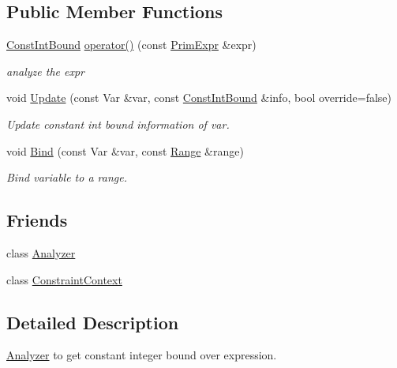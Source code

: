 \subsection*{Public Member Functions}
\begin{DoxyCompactItemize}
\item 
\hyperlink{classtvm_1_1arith_1_1ConstIntBound}{Const\+Int\+Bound} \hyperlink{classtvm_1_1arith_1_1ConstIntBoundAnalyzer_abb334cb2c9f408a907405f776b773043}{operator()} (const \hyperlink{classtvm_1_1PrimExpr}{Prim\+Expr} \&expr)
\begin{DoxyCompactList}\small\item\em analyze the expr \end{DoxyCompactList}\item 
void \hyperlink{classtvm_1_1arith_1_1ConstIntBoundAnalyzer_acde4cce7c61cd17625b5482d9c3dd422}{Update} (const Var \&var, const \hyperlink{classtvm_1_1arith_1_1ConstIntBound}{Const\+Int\+Bound} \&info, bool override=false)
\begin{DoxyCompactList}\small\item\em Update constant int bound information of var. \end{DoxyCompactList}\item 
void \hyperlink{classtvm_1_1arith_1_1ConstIntBoundAnalyzer_a5737b0f37bde66c12446f4f762e53aa2}{Bind} (const Var \&var, const \hyperlink{classtvm_1_1Range}{Range} \&range)
\begin{DoxyCompactList}\small\item\em Bind variable to a range. \end{DoxyCompactList}\end{DoxyCompactItemize}
\subsection*{Friends}
\begin{DoxyCompactItemize}
\item 
class \hyperlink{classtvm_1_1arith_1_1ConstIntBoundAnalyzer_a88d594816df596eed10643082b0d0805}{Analyzer}
\item 
class \hyperlink{classtvm_1_1arith_1_1ConstIntBoundAnalyzer_ab8bf22547cf1df0a28fc4ee98841ab89}{Constraint\+Context}
\end{DoxyCompactItemize}


\subsection{Detailed Description}
\hyperlink{classtvm_1_1arith_1_1Analyzer}{Analyzer} to get constant integer bound over expression. 

